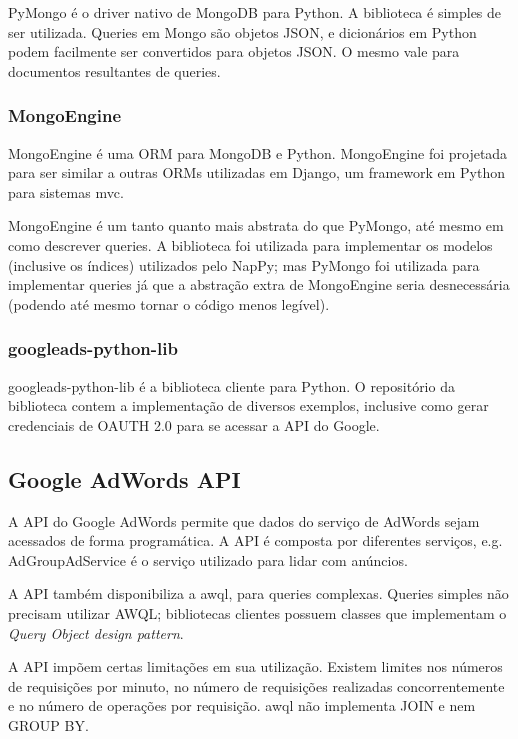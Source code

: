 PyMongo\cite{Pymongo} é o driver nativo de MongoDB para Python. A biblioteca é
simples de ser utilizada. Queries em Mongo são objetos JSON, e
dicionários em Python podem facilmente ser convertidos para
objetos JSON. O mesmo vale para documentos resultantes de
queries.

\subsubsection{MongoEngine}

MongoEngine\cite{Mongoengine} é uma ORM para MongoDB e Python. MongoEngine foi
projetada para ser similar a outras ORMs 
utilizadas em Django, um framework em Python para sistemas
\gls{mvc}.

MongoEngine é um tanto quanto mais abstrata do que PyMongo, até
mesmo em como descrever queries. A biblioteca foi utilizada para
implementar os modelos (inclusive os índices) utilizados pelo NapPy;
mas PyMongo foi utilizada para implementar queries já que a
abstração extra de MongoEngine seria desnecessária (podendo até
mesmo tornar o código menos legível).

\subsubsection{googleads-python-lib}

googleads-python-lib\cite{Googleads} é a biblioteca cliente para Python. O
repositório da biblioteca contem a implementação de diversos
exemplos, inclusive como gerar credenciais de OAUTH 2.0 para se
acessar a API do Google.

\subsection{Google AdWords API}

A API do Google AdWords\cite{AdWords} permite que dados do serviço de AdWords
sejam acessados de forma programática. A API é composta por
diferentes serviços, e.g. AdGroupAdService é o serviço utilizado
para lidar com anúncios. 

A API também disponibiliza a \gls{awql}\cite{AWQL}, 
para queries complexas. Queries simples não precisam
utilizar AWQL; bibliotecas clientes possuem classes que
implementam o \emph{Query Object design pattern}.

A API impõem certas limitações em sua utilização. Existem limites
nos números de requisições por minuto, no número de requisições
realizadas concorrentemente e no número de operações por
requisição. \gls{awql} não implementa JOIN e nem GROUP BY.

